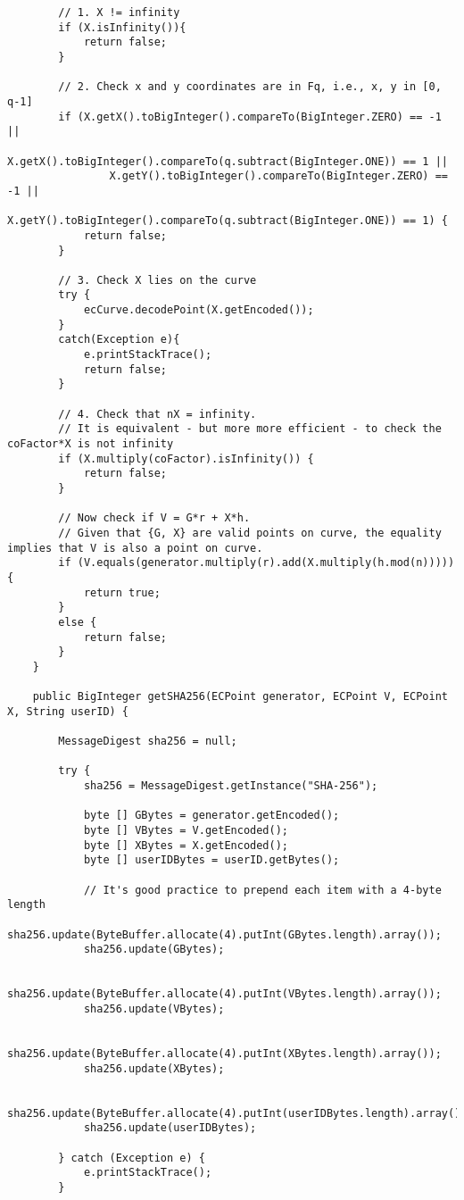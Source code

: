 \documentclass[../PFC.tex]{subfiles}
\begin{document}
\begin{lstlisting}
    	// 1. X != infinity
    	if (X.isInfinity()){
    		return false;
    	}
    	
    	// 2. Check x and y coordinates are in Fq, i.e., x, y in [0, q-1]
    	if (X.getX().toBigInteger().compareTo(BigInteger.ZERO) == -1 ||
    			X.getX().toBigInteger().compareTo(q.subtract(BigInteger.ONE)) == 1 ||
    			X.getY().toBigInteger().compareTo(BigInteger.ZERO) == -1 ||
    			X.getY().toBigInteger().compareTo(q.subtract(BigInteger.ONE)) == 1) {
    		return false;
    	}
    				
    	// 3. Check X lies on the curve
    	try {
    		ecCurve.decodePoint(X.getEncoded());
    	}
    	catch(Exception e){
    		e.printStackTrace();
    		return false;
    	}
    	
    	// 4. Check that nX = infinity.
    	// It is equivalent - but more more efficient - to check the coFactor*X is not infinity
    	if (X.multiply(coFactor).isInfinity()) { 
    		return false;
    	}
    	
    	// Now check if V = G*r + X*h. 
    	// Given that {G, X} are valid points on curve, the equality implies that V is also a point on curve.
    	if (V.equals(generator.multiply(r).add(X.multiply(h.mod(n))))) {
    		return true;
    	}
    	else {
    		return false;
    	}
    }

    public BigInteger getSHA256(ECPoint generator, ECPoint V, ECPoint X, String userID) {

    	MessageDigest sha256 = null;

    	try {
    		sha256 = MessageDigest.getInstance("SHA-256");
    		
    		byte [] GBytes = generator.getEncoded();
    		byte [] VBytes = V.getEncoded();
    		byte [] XBytes = X.getEncoded();
    		byte [] userIDBytes = userID.getBytes();
    		
    		// It's good practice to prepend each item with a 4-byte length
    		sha256.update(ByteBuffer.allocate(4).putInt(GBytes.length).array());
    		sha256.update(GBytes);

    		sha256.update(ByteBuffer.allocate(4).putInt(VBytes.length).array());
    		sha256.update(VBytes);

    		sha256.update(ByteBuffer.allocate(4).putInt(XBytes.length).array());
    		sha256.update(XBytes);
    		
    		sha256.update(ByteBuffer.allocate(4).putInt(userIDBytes.length).array());
    		sha256.update(userIDBytes);    	
   		
    	} catch (Exception e) {
    		e.printStackTrace();
    	}


\end{lstlisting}
\end{document}

